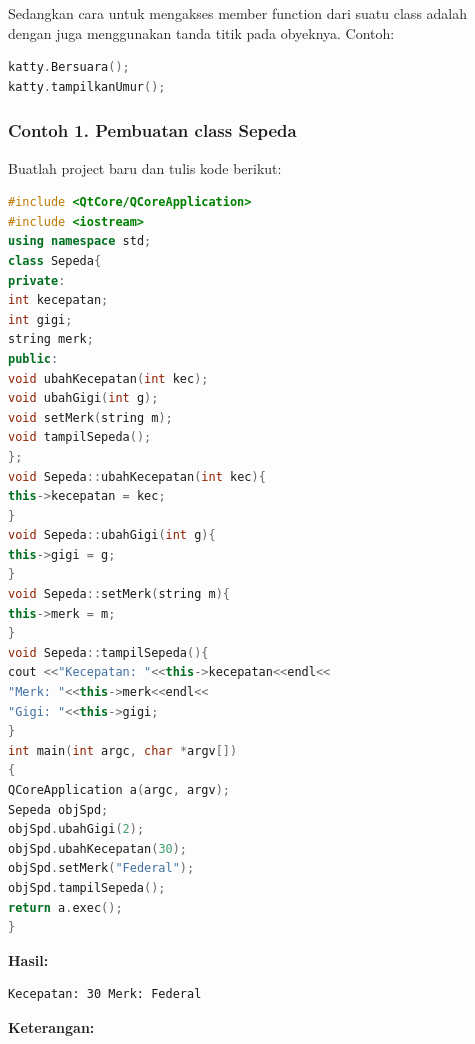 Sedangkan cara untuk mengakses member function dari suatu class adalah
dengan juga menggunakan tanda titik pada obyeknya. Contoh:

\begin{lstlisting}[language=c++]
katty.Bersuara();
katty.tampilkanUmur();
\end{lstlisting}

\subsubsection*{Contoh 1. Pembuatan class Sepeda}

Buatlah project baru dan tulis kode berikut:

\begin{lstlisting}[language=c++]
#include <QtCore/QCoreApplication>
#include <iostream>
using namespace std;
class Sepeda{
private:
int kecepatan;
int gigi;
string merk;
public:
void ubahKecepatan(int kec);
void ubahGigi(int g);
void setMerk(string m);
void tampilSepeda();
};
void Sepeda::ubahKecepatan(int kec){
this->kecepatan = kec;
}
void Sepeda::ubahGigi(int g){
this->gigi = g;
}
void Sepeda::setMerk(string m){
this->merk = m;
}
void Sepeda::tampilSepeda(){
cout <<"Kecepatan: "<<this->kecepatan<<endl<<
"Merk: "<<this->merk<<endl<<
"Gigi: "<<this->gigi;
}
int main(int argc, char *argv[])
{
QCoreApplication a(argc, argv);
Sepeda objSpd;
objSpd.ubahGigi(2);
objSpd.ubahKecepatan(30);
objSpd.setMerk("Federal");
objSpd.tampilSepeda();
return a.exec();
}
\end{lstlisting}

\textbf{Hasil:}

\begin{verbatim}
Kecepatan: 30 Merk: Federal
\end{verbatim}

\textbf{Keterangan:}

